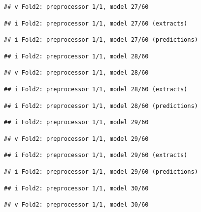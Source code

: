 \documentclass[
]{article}
\begin{document}
\begin{verbatim}
## v Fold2: preprocessor 1/1, model 27/60
\end{verbatim}

\begin{verbatim}
## i Fold2: preprocessor 1/1, model 27/60 (extracts)
\end{verbatim}

\begin{verbatim}
## i Fold2: preprocessor 1/1, model 27/60 (predictions)
\end{verbatim}

\begin{verbatim}
## i Fold2: preprocessor 1/1, model 28/60
\end{verbatim}

\begin{verbatim}
## v Fold2: preprocessor 1/1, model 28/60
\end{verbatim}

\begin{verbatim}
## i Fold2: preprocessor 1/1, model 28/60 (extracts)
\end{verbatim}

\begin{verbatim}
## i Fold2: preprocessor 1/1, model 28/60 (predictions)
\end{verbatim}

\begin{verbatim}
## i Fold2: preprocessor 1/1, model 29/60
\end{verbatim}

\begin{verbatim}
## v Fold2: preprocessor 1/1, model 29/60
\end{verbatim}

\begin{verbatim}
## i Fold2: preprocessor 1/1, model 29/60 (extracts)
\end{verbatim}

\begin{verbatim}
## i Fold2: preprocessor 1/1, model 29/60 (predictions)
\end{verbatim}

\begin{verbatim}
## i Fold2: preprocessor 1/1, model 30/60
\end{verbatim}

\begin{verbatim}
## v Fold2: preprocessor 1/1, model 30/60
\end{verbatim}
\end{document}
